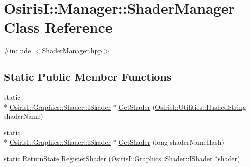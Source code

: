 \hypertarget{class_osiris_i_1_1_manager_1_1_shader_manager}{\section{Osiris\-I\-:\-:Manager\-:\-:Shader\-Manager Class Reference}
\label{class_osiris_i_1_1_manager_1_1_shader_manager}
}


{\ttfamily \#include $<$Shader\-Manager.\-hpp$>$}

\subsection*{Static Public Member Functions}
\begin{DoxyCompactItemize}
\item 
static \\*
\hyperlink{class_osiris_i_1_1_graphics_1_1_shader_1_1_i_shader}{Osiris\-I\-::\-Graphics\-::\-Shader\-::\-I\-Shader} $\ast$ \hyperlink{class_osiris_i_1_1_manager_1_1_shader_manager_a2a05061d26779361f740ee21b2adc104}{Get\-Shader} (\hyperlink{class_osiris_i_1_1_utilities_1_1_hashed_string}{Osiris\-I\-::\-Utilities\-::\-Hashed\-String} shader\-Name)
\item 
static \\*
\hyperlink{class_osiris_i_1_1_graphics_1_1_shader_1_1_i_shader}{Osiris\-I\-::\-Graphics\-::\-Shader\-::\-I\-Shader} $\ast$ \hyperlink{class_osiris_i_1_1_manager_1_1_shader_manager_a7a3f120e14ea801e53c2b29a466b02cd}{Get\-Shader} (long shader\-Name\-Hash)
\item 
static \hyperlink{namespace_osiris_i_a8f53bf938dc75c65c6a529694514013e}{Return\-State} \hyperlink{class_osiris_i_1_1_manager_1_1_shader_manager_aaedca46b45f1e8ddc189ec96d074ce0b}{Register\-Shader} (\hyperlink{class_osiris_i_1_1_graphics_1_1_shader_1_1_i_shader}{Osiris\-I\-::\-Graphics\-::\-Shader\-::\-I\-Shader} $\ast$shader)
\end{DoxyCompactItemize}



